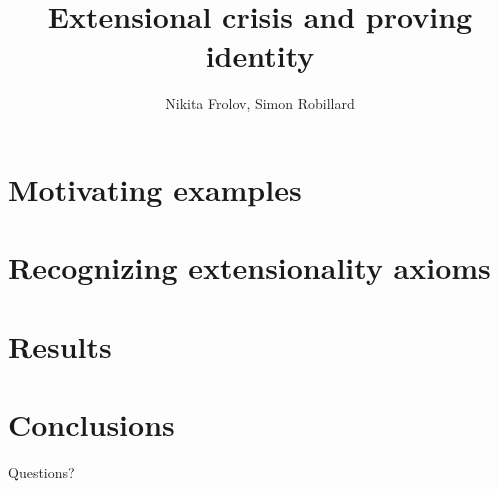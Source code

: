 \documentclass[14pt]{beamer}
\title{Extensional crisis and proving identity}
\author{Nikita Frolov, Simon Robillard}
\institute{}
\date{}
\begin{document}
\begin{frame}
  \maketitle
\end{frame}

\section{Motivating examples}


\section{Recognizing extensionality axioms}


\section{Results}


\section{Conclusions}


\begin{frame}
  \begin{center}
    \Huge{Questions?}
  \end{center}
\end{frame}
\end{document}
